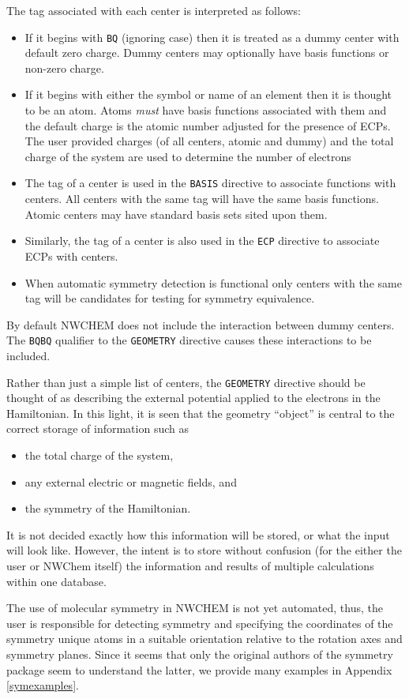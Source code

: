 The tag associated with each center is interpreted as follows:
\begin{itemize}
\item If it begins with \verb+BQ+ (ignoring case) then it is treated
      as a dummy center with default zero charge. Dummy centers may 
      optionally have basis functions or non-zero charge.
\item If it begins with either the symbol or name of an element then
      it is thought to be an atom.  Atoms {\em must} have basis
      functions associated with them and the default charge is the
      atomic number adjusted for the presence of ECPs.  The user
      provided charges (of all centers, atomic and dummy) and the
      total charge of the system are used to determine the number of
      electrons
\item The tag of a center is used in the \verb+BASIS+ directive to
      associate functions with centers.  All centers with the same tag
      will have the same basis functions.  Atomic centers may have
      standard basis sets sited upon them.
\item Similarly, the tag of a center is also used in the \verb+ECP+
      directive to associate ECPs with centers.
\item When automatic symmetry detection is functional only centers
      with the same tag will be candidates for testing for symmetry
      equivalence.
\end{itemize}

By default NWCHEM does not include the interaction between dummy
centers.  The \verb+BQBQ+ qualifier to the \verb+GEOMETRY+ directive
causes these interactions to be included.

Rather than just a simple list of centers, the \verb+GEOMETRY+
directive should be thought of as describing the external potential
applied to the electrons in the Hamiltonian.  In this light, it is
seen that the geometry ``object'' is central to the correct storage
of information such as
\begin{itemize}
\item the total charge of the system,
\item any external electric or magnetic fields, and
\item the symmetry of the Hamiltonian.
\end{itemize}
It is not decided exactly how this information will be stored, or what
the input will look like. However, the intent is to store without
confusion (for the either the user or NWChem itself) the information
and results of multiple calculations within one database.

 The use of molecular symmetry in NWCHEM is not yet automated, thus,
the user is responsible for detecting symmetry and specifying the
coordinates of the symmetry unique atoms in a suitable orientation
relative to the rotation axes and symmetry planes.  Since it seems
that only the original authors of the symmetry package seem to
understand the latter, we provide many examples in Appendix
\ref{symexamples}.
